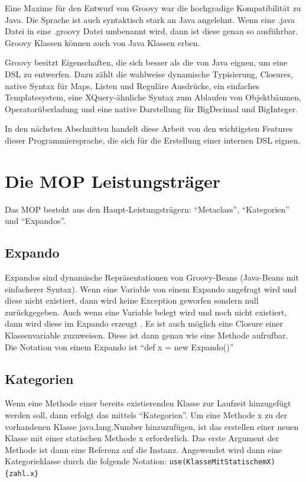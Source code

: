 \documentclass[11pt,english,ngerman, headsepline]{scrreprt}
\begin{document}
Eine Maxime für den Entwurf von Groovy war die hochgradige Kompatibilität zu
Java. Die Sprache ist auch syntaktisch stark an Java angelehnt. Wenn eine .java
Datei in eine .groovy Datei umbenannt wird, dann ist diese genau so ausführbar.
Groovy Klassen können auch von Java Klassen erben.

Groovy besitzt Eigenschaften, die sich besser als die von Java eignen, um eine
DSL zu entwerfen. Dazu zählt die wahlweise dynamische Typisierung, Closures,
native Syntax für Maps, Listen und Reguläre Ausdrücke, ein einfaches
Templatesystem, eine
XQuery-ähnliche Syntax zum Ablaufen von Objektbäumen, Operatorüberladung und
eine native Darstellung für BigDecimal und BigInteger.  

In den nächsten Abschnitten handelt diese Arbeit von den wichtigsten Features
dieser Programmiersprache, die sich für die Erstellung einer internen DSL
eignen. 


\section{Die MOP Leistungsträger}
Das MOP besteht aus den Haupt-Leistungsträgern: ``Metaclass'',
``Kategorien'' und ``Expandos''.

\subsection{Expando}\label{expando}

Expandos sind dynamische Repräsentationen von Groovy-Beans (Java-Beans mit
einfacherer Syntax).
Wenn eine Variable von einem Expando angefragt wird und diese nicht existiert, dann wird
keine Exception geworfen sondern null zurückgegeben. Auch wenn eine Variable
belegt wird und noch nicht existiert, dann wird diese im Expando erzeugt
.
Es ist auch möglich eine Closure einer Klassenvariable zuzuweisen.
Diese ist dann genau wie eine Methode aufrufbar. Die Notation von einem
Expando ist ``def x = new Expando()''

\subsection{Kategorien}

Wenn eine Methode einer bereits existierenden Klasse zur Laufzeit hinzugefügt
werden soll, dann erfolgt das mittels ``Kategorien''.
Um eine Methode x zu der vorhandenen Klasse java.lang.Number hinzuzufügen, ist
das erstellen einer neuen Klasse mit einer statischen Methode x erforderlich.
Das erste Argument der Methode ist dann eine Referenz auf die Instanz.
Angewendet wird dann eine Kategorieklasse durch die folgende Notation:
\texttt{use(KlasseMitStatischemX)\{zahl.x\}}
\end{document}
